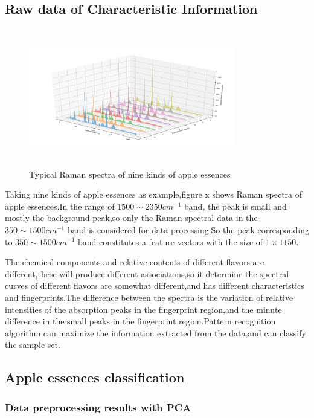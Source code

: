 \documentclass[a4paper]{article}
\begin{document}
\subsection{Raw data of Characteristic Information}
\begin{figure}[h]
  \centering
  \includegraphics[width=9cm,height=6cm]{Typical_Raman_spectra}
  \caption{Typical Raman spectra of nine kinds of apple essences}
\end{figure}
Taking nine kinds of apple essences as example,figure x shows Raman spectra of apple essences.In the range of $1500 \sim 2350cm^{-1}$ band, the peak is small and mostly the background peak,so only the Raman spectral data in the $350 \sim 1500cm^{-1}$ band is considered for data processing.So the peak corresponding to $350 \sim 1500cm^{-1}$ band constitutes a feature vectors with the size of $ 1\times 1150 $.

The chemical components and relative contents of different flavors are different,these will produce different associations,so it  determine the spectral curves of different flavors are somewhat different,and has different  characteristics and fingerprints.The difference between the spectra is the variation of relative intensities of the absorption peaks in the fingerprint region,and the minute difference in the small peaks in the fingerprint region.Pattern recognition algorithm can maximize the information extracted from the data,and can classify the sample set.


\subsection{Apple essences classification}
    \subsubsection{Data preprocessing results with PCA}
\end{document}
